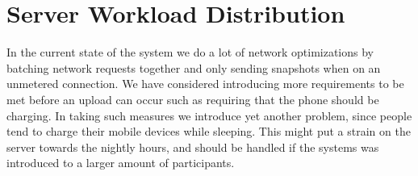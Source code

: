 \section{Server Workload Distribution}

In the current state of the system we do a lot of network optimizations by batching network requests together and only sending snapshots when on an unmetered connection. We have considered introducing more requirements to be met before an upload can occur such as requiring that the phone should be charging. In taking such measures we introduce yet another problem, since people tend to charge their mobile devices while sleeping. This might put a strain on the server towards the nightly hours, and should be handled if the systems was introduced to a larger amount of participants. 

